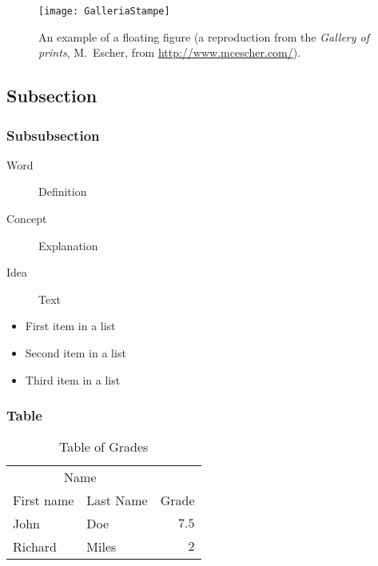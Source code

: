 \documentclass[
12pt, %
a4paper, %
oneside, %
headinclude,footinclude, %
BCOR5mm, %
]{scrartcl}
\begin{document}
\begin{figure}[tb]
\centering 
\texttt{[image: GalleriaStampe]} 
\caption[An example of a floating figure]{An example of a floating figure (a reproduction from the \emph{Gallery of prints}, M.~Escher, from \url{http://www.mcescher.com/}).} %
\label{fig:gallery} 
\end{figure}

\lipsum[10] %


\subsection{Subsection}

\lipsum[11] %

\subsubsection{Subsubsection}

\lipsum[12] %

\begin{description}
\item[Word] Definition
\item[Concept] Explanation
\item[Idea] Text
\end{description}

\lipsum[12] %

\begin{itemize}[noitemsep] %
\item First item in a list
\item Second item in a list
\item Third item in a list
\end{itemize}

\subsubsection{Table}

\lipsum[13] %

\begin{table}[hbt]
\caption{Table of Grades}
\centering
\begin{tabular}{llr}
\toprule
\multicolumn{2}{c}{Name} \\
\cmidrule(r){1-2}
First name & Last Name & Grade \\
\midrule
John & Doe & $7.5$ \\
Richard & Miles & $2$ \\
\bottomrule
\end{tabular}
\label{tab:label}
\end{table}
\end{document}
